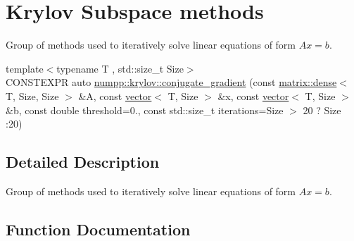\hypertarget{group__numpp__krylov}{}\section{Krylov Subspace methods}
\label{group__numpp__krylov}


Group of methods used to iteratively solve linear equations of form $ Ax = b$.  


\begin{DoxyCompactItemize}
\item 
{\footnotesize template$<$typename T , std\+::size\+\_\+t Size$>$ }\\C\+O\+N\+S\+T\+E\+X\+PR auto \hyperlink{group__numpp__krylov_ga5e105c0002fbd19b7c8144540040550f}{numpp\+::krylov\+::conjugate\+\_\+gradient} (const \hyperlink{classnumpp_1_1matrix_1_1dense}{matrix\+::dense}$<$ T, Size, Size $>$ \&A, const \hyperlink{classnumpp_1_1vector}{vector}$<$ T, Size $>$ \&x, const \hyperlink{classnumpp_1_1vector}{vector}$<$ T, Size $>$ \&b, const double threshold=0., const std\+::size\+\_\+t iterations=Size $>$ 20 ? Size \+:20)
\end{DoxyCompactItemize}


\subsection{Detailed Description}
Group of methods used to iteratively solve linear equations of form $ Ax = b$. 



\subsection{Function Documentation}
\mbox{\label{group__numpp__krylov_ga5e105c0002fbd19b7c8144540040550f}} 

